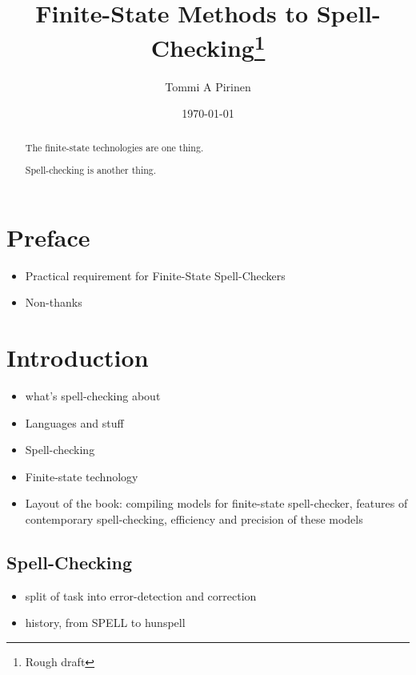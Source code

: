 \documentclass[officiallayout]{unihelcompling}
\title{Finite-State Methods to Spell-Checking\footnote{Rough draft}}
\author{Tommi A Pirinen}
\date{\today}
\begin{document}
\frontmatter

\maketitle

\begin{abstract}
    The finite-state technologies are one thing.

    Spell-checking is another thing.
\end{abstract}

\tableofcontents

\mainmatter

\chapter*{Preface}

\begin{itemize}
    \item Practical requirement for Finite-State Spell-Checkers
    \item Non-thanks
\end{itemize}

\chapter{Introduction}

\begin{itemize}
    \item what's spell-checking about
    \item Languages and stuff
    \item Spell-checking
    \item Finite-state technology
    \item Layout of the book: compiling models for finite-state spell-checker,
        features of contemporary spell-checking, efficiency and precision of
        these models
\end{itemize}

\section{Spell-Checking}

\begin{itemize}
    \item split of task into error-detection and correction
    \item history, from SPELL to hunspell
\end{itemize}
\end{document}
